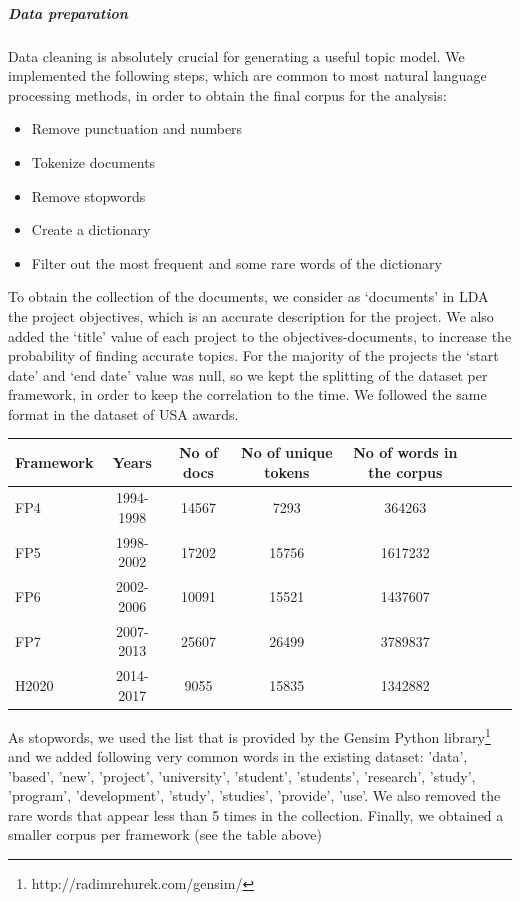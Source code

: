 \documentclass[12pt]{report}
\begin{document}
\subparagraph{Data preparation}

Data cleaning is absolutely crucial for generating a useful topic model. 
We implemented the following steps, which are common to most natural 
language processing methods, in order to obtain the final corpus for the 
analysis:

\begin{itemize}
\item Remove punctuation and numbers
\item Tokenize documents
\item Remove stopwords
\item Create a dictionary
\item Filter out the most frequent and some rare words of the dictionary
\end{itemize}

To obtain the collection of the documents, we consider as ‘documents’ in LDA the
project objectives, which is an accurate description for the project. We also
added the ‘title’ value of each project to the objectives-documents, to increase
the probability of finding accurate topics. For the majority of the projects the
‘start date’ and ‘end date’ value was null, so we kept the splitting of the
dataset per framework, in order to keep the correlation to the time. We followed
the same format in the dataset of USA awards.


\begin{center}
\begin{tabular}{l*{6}{c}r}
Framework & Years & No of docs & No of unique tokens & No of words in the corpus \\
\hline
FP4 & 1994-1998 & 14567 & 7293 & 364263 \\
FP5 & 1998-2002 & 17202 & 15756 & 1617232 \\
FP6 & 2002-2006 & 10091 & 15521 & 1437607 \\
FP7 & 2007-2013 & 25607 & 26499 & 3789837 \\
H2020 & 2014-2017 & 9055 & 15835 & 1342882 \\
\end{tabular}
\end{center}

As stopwords, we used the list that is provided by the Gensim Python
library\footnote{http://radimrehurek.com/gensim/} and we added following very
common words in the existing dataset: 'data', 'based', 'new', 'project',
'university', 'student', 'students', 'research', 'study', 'program',
'development', 'study', 'studies', 'provide', 'use'. We also removed the rare
words that appear less than 5 times in the collection. Finally, we obtained a
smaller corpus per framework (see the table above)
\end{document}
